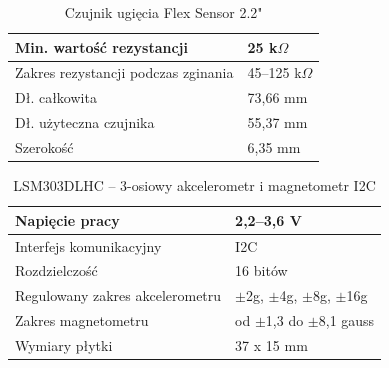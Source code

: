 \documentclass[12pt,a4paper]{article}
\begin{document}
\begin{table}[h]
\centering
\begin{tabularx}
{\textwidth}{ |X|X| }
\hline
Min. wartość rezystancji & 25 k$\Omega$ \\
\hline
Zakres rezystancji podczas zginania & 45--125 k$\Omega$ \\
\hline
Dł. całkowita & 73,66 mm \\
\hline
Dł. użyteczna czujnika & 55,37 mm \\ 
\hline
Szerokość & 6,35 mm \\
\hline
\end{tabularx}
\caption{Czujnik ugięcia Flex Sensor 2.2"}
\end{table}


\begin{table}[h]
\centering
\begin{tabularx}
{\textwidth}{ |X|X| }
\hline
Napięcie pracy & 2,2--3,6 V \\
\hline
Interfejs komunikacyjny & I2C \\
\hline
Rozdzielczość & 16 bitów \\
\hline
Regulowany zakres akcelerometru &  $\pm$2g, $\pm$4g, $\pm$8g, $\pm$16g \\ 
\hline
Zakres magnetometru &  od $\pm$1,3 do $\pm$8,1 gauss \\ 
\hline
Wymiary płytki & 37 x 15 mm \\
\hline
\end{tabularx}
\caption{LSM303DLHC -- 3-osiowy akcelerometr i magnetometr I2C}
\end{table}
\end{document}
